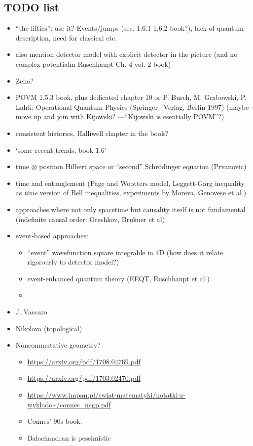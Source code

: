 \subsection*{TODO list}
\begin{itemize}
  \iftodo
  \item ``the fifties'': use it? Events/jumps (sec. 1.6.1 1.6.2 book?), lack of quantum description, need for classical etc.
  \fi
  \item also mention detector model with explicit detector in the picture (and no complex potentialm Ruschhaupt Ch. 4 vol. 2 book)
  \item Zeno?
  \item POVM 1.5.3 book, plus dedicated chapter 10 or P. Busch, M. Grabowski, P. Lahti: Operational Quantum Physics (Springer–
  Verlag, Berlin 1997) (maybe move up and join with Kijowski? ---``Kijowski is esentially POVM''?)
  \item consistent histories, Halliwell chapter in the book?
  \item `some recent trends, book 1.6'
  \item
      time $\otimes$ position Hilbert space or ``second'' Schr\"odinger equation (Prvanovic)
  \item time and entanglement (Page and Wootters model, Leggett-Garg inequality as \emph{time} version of Bell inequalities, experiments by Moreva, Genovese et al.)
  \item approaches where not only spacetime but causality itself is not fundamental (indefinite causal order: Oreshkov, Brukner et al)
  \item event-based approaches:
    \begin{itemize}
      \item ``event'' wavefunction square integrable in 4D (how does it relate rigorously to detector model?)
      \item event-enhanced quantum theory (EEQT, Ruschhaupt et al.)
      \item
    \end{itemize}
  \item J. Vaccaro
  \item Nikolova (topological)
  \item Noncommutative geometry?
  \begin{itemize}
    \item \url{https://arxiv.org/pdf/1708.04769.pdf}
    \item \url{https://arxiv.org/pdf/1703.02470.pdf}
    \item \url{https://www.impan.pl/swiat-matematyki/notatki-z-wyklado~/connes_ncgp.pdf}
    \item Connes' 90s book.
    \item Balachandran is pessimistic
  \end{itemize}
\end{itemize}
